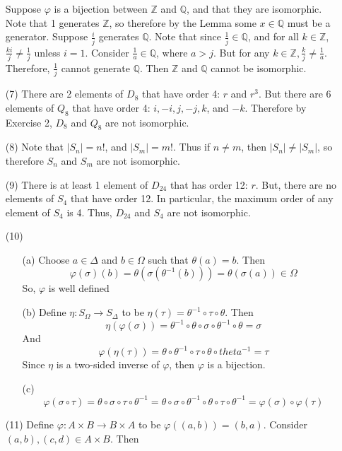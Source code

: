 \documentclass[12pt]{article}
\begin{document}
\begin{itemize}
Suppose $\varphi$ is a bijection between $\mathbb{Z}$ and $\mathbb{Q}$, and that they are isomorphic. Note that 1 generates $\mathbb{Z}$, so therefore by the Lemma some $x \in \mathbb{Q}$ must be a generator. Suppose $\frac{i}{j}$ generates $\mathbb{Q}$. Note that since $\frac{1}{j} \in \mathbb{Q}$, and for all $k \in \mathbb{Z}$, $\frac{ki}{j} \neq \frac{1}{j}$ unless $i = 1$. Consider $\frac{1}{a} \in \mathbb{Q}$, where $a > j$. But for any $k \in \mathbb{Z}, \frac{k}{j} \neq \frac{1}{a}$. Therefore, $\frac{1}{j}$ cannot generate $\mathbb{Q}$. Then $\mathbb{Z}$ and $\mathbb{Q}$ cannot be isomorphic.
\item[(7)]
There are 2 elements of $D_8$ that have order 4: $r$ and $r^3$. But there are 6 elements of $Q_8$ that have order 4: $i, -i, j, -j, k$, and $-k$. Therefore by Exercise 2, $D_8$ and $Q_8$ are not isomorphic.
\item[(8)]
Note that $|S_n| = n!$, and $|S_m| = m!$. Thus if $n \neq m$, then $|S_n| \neq |S_m|$, so therefore $S_n$ and $S_m$ are not isomorphic.
\item[(9)]
There is at least 1 element of $D_{24}$ that has order 12: $r$. But, there are no elements of $S_4$ that have order 12. In particular, the maximum order of any element of $S_4$ is 4. Thus, $D_{24}$ and $S_4$ are not isomorphic.
\item[(10)]
\begin{itemize}
\item[(a)]
Choose $a \in \Delta$ and $b \in \Omega$ such that $\theta(a) = b$. Then
$$\varphi(\sigma)(b) = \theta(\sigma(\theta^{-1}(b))) = \theta(\sigma(a)) \in \Omega$$
So, $\varphi$ is well defined
\item[(b)]
Define $\eta: S_\Omega \rightarrow S_\Delta$ to be $\eta(\tau) = \theta^{-1} \circ \tau \circ \theta$. Then
$$\eta(\varphi(\sigma)) = \theta^{-1} \circ \theta \circ \sigma \circ \theta^{-1} \circ \theta = \sigma$$
And
$$\varphi(\eta(\tau)) = \theta \circ \theta^{-1} \circ \tau \circ \theta \circ theta^{-1} = \tau$$
Since $\eta$ is a two-sided inverse of $\varphi$, then $\varphi$ is a bijection.
\item[(c)]
$$\varphi(\sigma \circ \tau) = \theta \circ \sigma \circ \tau \circ \theta^{-1} = \theta \circ \sigma \circ \theta^{-1} \circ \theta \circ \tau \circ \theta^{-1} = \varphi(\sigma) \circ \varphi(\tau)$$
\end{itemize}
\item[(11)]
Define $\varphi: A \times B \rightarrow B \times A$ to be $\varphi((a, b)) = (b, a)$. Consider $(a, b), (c, d) \in A \times B$. Then

\end{itemize}
\end{document}
